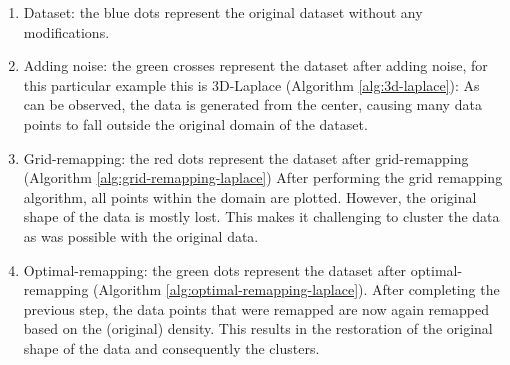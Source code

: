 \begin{enumerate}
    \item Dataset: the blue dots represent the original dataset without any modifications.
    \item Adding noise: the green crosses represent the dataset after adding noise, for this particular example this is 3D-Laplace (Algorithm \ref{alg:3d-laplace}):
          As can be observed, the data is generated from the center, causing many data points to fall outside the original domain of the dataset.
    \item Grid-remapping: the red dots represent the dataset after grid-remapping (Algorithm \ref{alg:grid-remapping-laplace})
          After performing the grid remapping algorithm, all points within the domain are plotted.
          However, the original shape of the data is mostly lost.
          This makes it challenging to cluster the data as was possible with the original data.
    \item Optimal-remapping: the green dots represent the dataset after optimal-remapping (Algorithm \ref{alg:optimal-remapping-laplace}).
          After completing the previous step, the data points that were remapped are now again remapped based on the (original) density.
          This results in the restoration of the original shape of the data and consequently the clusters.
\end{enumerate}
